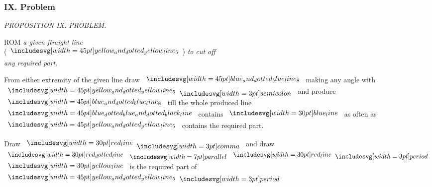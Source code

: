 \documentclass[11pt,preview]{standalone}
\begin{document}
\subsubsection{IX. Problem}

\begin{minipage}[t]{0.54\textwidth}
    \begin{center}
        \textit{PROPOSITION IX. PROBLEM.}\label{book6pr9} \\
    \end{center}

    \hfill

    \begin{center}
        \raggedright \lettrine[lines=3, loversize=1, nindent=0pt]{}{}ROM \textit{a given ſtraight line}\\ (\hspace{-1ex}$\bimg{yellow_and_dotted_yellow_line_5}$\hspace{-1ex}) \textit{to cut off\\ any required part}.
    \end{center}

    \hfill

    \hfill

    \raggedright From either extremity of the given line draw $\bimg{blue_and_dotted_blue_line_8}$ making any angle with $\bimg{yellow_and_dotted_yellow_line_5} \bsemicolon$ and produce $\bimg{blue_and_dotted_blue_line_8}$ till the whole produced line $\bimg{blue_dotted_blue_and_dotted_black_line}$ contains $\blueline$ as often as $\bimg{yellow_and_dotted_yellow_line_5}$ contains the required part.
\end{minipage}%
\hfill
\begin{minipage}[t]{0.43\textwidth}
    \vspace{10pt}
    
\end{minipage}%

\hfill

\begin{center}
    Draw $\redline \bcomma$ and draw $\dottedredline \bparallel \redline \bperiod$\\
    $\yellowline$ is the required part of $\bimg{yellow_and_dotted_yellow_line_5} \bperiod$
\end{center}
\end{document}
